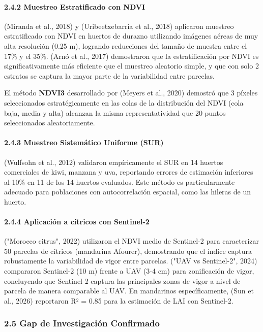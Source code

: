 \paragraph{2.4.2 Muestreo Estratificado con NDVI}


(Miranda et al., 2018) y (Uribeetxebarria et al., 2018) aplicaron muestreo estratificado con NDVI en huertos de durazno utilizando imágenes aéreas de muy alta resolución (0.25 m), logrando reducciones del tamaño de muestra entre el 17\% y el 35\%. (Arnó et al., 2017) demostraron que la estratificación por NDVI es significativamente más eficiente que el muestreo aleatorio simple, y que con solo 2 estratos se captura la mayor parte de la variabilidad entre parcelas.


El método \textbf{NDVI3} desarrollado por (Meyers et al., 2020) demostró que 3 píxeles seleccionados estratégicamente en las colas de la distribución del NDVI (cola baja, media y alta) alcanzan la misma representatividad que 20 puntos seleccionados aleatoriamente.


\paragraph{2.4.3 Muestreo Sistemático Uniforme (SUR)}


(Wulfsohn et al., 2012) validaron empíricamente el SUR en 14 huertos comerciales de kiwi, manzana y uva, reportando errores de estimación inferiores al 10\% en 11 de los 14 huertos evaluados. Este método es particularmente adecuado para poblaciones con autocorrelación espacial, como las hileras de un huerto.


\paragraph{2.4.4 Aplicación a cítricos con Sentinel-2}


("Morocco citrus", 2022) utilizaron el NDVI medio de Sentinel-2 para caracterizar 50 parcelas de cítricos (mandarina Afourer), demostrando que el índice captura robustamente la variabilidad de vigor entre parcelas. ("UAV vs Sentinel-2", 2024) compararon Sentinel-2 (10 m) frente a UAV (3-4 cm) para zonificación de vigor, concluyendo que Sentinel-2 captura las principales zonas de vigor a nivel de parcela de manera comparable al UAV. En mandarinos específicamente, (Sun et al., 2026) reportaron R² = 0.85 para la estimación de LAI con Sentinel-2.


\subsubsection{2.5 Gap de Investigación Confirmado}


